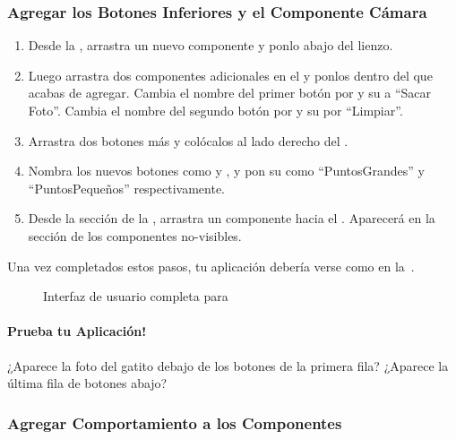 \subsubsection*{Agregar los Botones Inferiores y el Componente Cámara}

\begin{enumerate}

\item Desde la \palette, arrastra un nuevo componente
   y ponlo abajo del lienzo.

\item Luego arrastra dos componentes  adicionales en
  el \viewer y ponlos dentro del  que
  acabas de agregar. Cambia el nombre del primer botón por
   y su  a ``Sacar
  Foto''. Cambia el nombre del segundo botón por
   y su  por ``Limpiar''.

\item Arrastra dos botones más y colócalos al lado derecho del
  .

\item Nombra los nuevos botones como  y
  , y pon su  como
  ``PuntosGrandes'' y ``PuntosPequeños'' respectivamente.

\item Desde la sección \media de la \palette, arrastra un componente
   hacia el \viewer. Aparecerá en la sección de los
  componentes no-visibles.

\end{enumerate}
	
Una vez completados estos pasos, tu aplicación debería verse como en
la~.

\begin{figure}[H]
\centering
\caption{Interfaz de usuario completa para }
\label{fig:PaintPot4}
\end{figure}

\paragraph{Prueba tu Aplicación!} ¿Aparece la foto del gatito debajo
de los botones de la primera fila? ¿Aparece la última fila de botones abajo?

\subsubsection*{Agregar Comportamiento a los Componentes}

